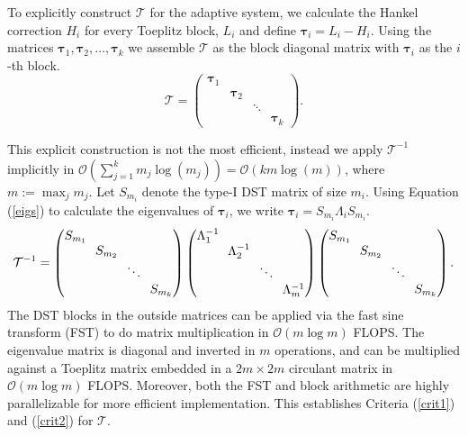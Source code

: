 \documentclass[review]{siamart251216}
\newcommand{\bigOh}{\mathcal{O}}
\newcommand{\Hank}{{ H }}
\newcommand{\Toe}{{ L }}
\newcommand{\Tau}{\mathcal{T}}
\newcommand{\ptau}{{\bm{\tau}}}
\begin{document}
To explicitly construct $\Tau$ for the adaptive system, we calculate the Hankel correction $\Hank_i$ for every Toeplitz block, $\Toe_i$ and define $\ptau_i = \Toe_i - \Hank_i$.  Using the matrices $\ptau_1, \ptau_2, \dots, \ptau_k$ we assemble $\Tau$ as the block diagonal matrix with $\ptau_i$ as the $i$-th block. 
$$\Tau = \begin{pmatrix}
		\ptau_1 &&& \\ & \ptau_2 && \\ && \ddots & \\ &&& \ptau_k
	\end{pmatrix}.$$

This explicit construction is not the most efficient, instead we apply $\Tau^{-1}$ implicitly in $\bigOh \left( \sum_{j=1}^k m_j \log(m_j) \right) = \bigOh \left( k m \log ( m) \right) $,  where $m:= \max_j m_j$. Let $S_{m_i}$ denote the type-I DST matrix of size $m_i$.  Using Equation (\ref{eigs}) to calculate the eigenvalues of $\ptau_i$, we write $\ptau_i =  S_{m_i} \Lambda_i S_{m_i}$. 
\begin{equation} \label{diag}
	\Tau^{-1} = 
	\begingroup %
	\setlength\arraycolsep{3.5pt}
	\begin{pmatrix}
		S_{m_1} &&& \\ & S_{m_2} && \\ && \ddots & \\ &&& S_{m_k}
	\end{pmatrix}
	\begin{pmatrix}
		\Lambda_1^{-1} &&& \\ & \Lambda_2^{-1} && \\ && \ddots & \\ &&& \Lambda_m^{-1}
	\end{pmatrix}
	\begin{pmatrix}
		S_{m_1} &&& \\ & S_{m_2} && \\ && \ddots & \\ &&& S_{m_k}
		\end{pmatrix}.
	\endgroup
\end{equation}
The DST blocks in the outside matrices can be applied via the fast sine transform (FST) to do matrix multiplication in $\bigOh(m \log m)$ FLOPS. The eigenvalue matrix is diagonal and inverted in $m$ operations, and can be multiplied against a Toeplitz matrix embedded in a $2m \times 2m$ circulant matrix in $ \bigOh(m \log m)$ FLOPS. Moreover, both the FST and block arithmetic are highly parallelizable for more efficient implementation. This establishes Criteria (\ref{crit1}) and (\ref{crit2}) for $\Tau$. 
\end{document}
